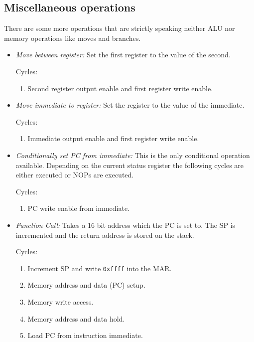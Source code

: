 \subsection{Miscellaneous operations}
There are some more operations that are strictly speaking neither \gls{ALU} nor memory operations like moves and branches.
\begin{itemize}
  \item \emph{Move between register:} Set the first register to the value of the second.

  Cycles:
  \begin{enumerate}
    \item Second register output enable and first register write enable.
  \end{enumerate}

  \item \emph{Move immediate to register:} Set the register to the value of the immediate.

  Cycles:
  \begin{enumerate}
    \item Immediate output enable and first register write enable.
  \end{enumerate}

  \item \emph{Conditionally set \gls{PC} from immediate:} This is the only conditional operation available.
  Depending on the current status register the following cycles are either executed or \glspl{NOP} are executed.

  Cycles:
  \begin{enumerate}
    \item \gls{PC} write enable from immediate.
  \end{enumerate}

  \item \emph{Function Call:} Takes a 16 bit address which the \gls{PC} is set to.
  The \gls{SP} is incremented and the return address is stored on the stack.

  Cycles:
  \begin{enumerate}
    \item Increment \gls{SP} and write \texttt{0xffff} into the \gls{MAR}.
    \item Memory address and data (\gls{PC}) setup.
    \item Memory write access.
    \item Memory address and data hold.
    \item Load \gls{PC} from instruction immediate.
  \end{enumerate}


\end{itemize}

